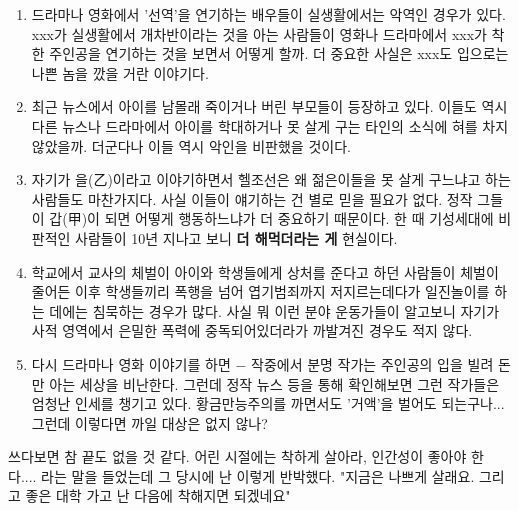 \vspace{5mm}
\begin{enumerate}
    \item 드라마나 영화에서 '선역'을 연기하는 배우들이 실생활에서는 악역인 경우가 있다.
    xxx가 실생활에서 개차반이라는 것을 아는 사람들이 영화나 드라마에서 xxx가 착한 주인공을 연기하는 것을 보면서 어떻게 할까.
    더 중요한 사실은 xxx도 입으로는 나쁜 놈을 깠을 거란 이야기다.
    \vspace{5mm}
    
    \item 최근 뉴스에서 아이를 남몰래 죽이거나 버린 부모들이 등장하고 있다.
    이들도 역시 다른 뉴스나 드라마에서 아이를 학대하거나 못 살게 구는 타인의 소식에 혀를 차지 않았을까.
    더군다나 이들 역시 악인을 비판했을 것이다.
    \vspace{5mm}
    
    \item 자기가 을(乙)이라고 이야기하면서 헬조선은 왜 젊은이들을 못 살게 구느냐고 하는 사람들도 마찬가지다.
    사실 이들이 얘기하는 건 별로 믿을 필요가 없다. 정작 그들이 갑(甲)이 되면 어떻게 행동하느냐가 더 중요하기 때문이다.
    한 때 기성세대에 비판적인 사람들이 10년 지나고 보니 \textbf{더 해먹더라는 게} 현실이다.
    \vspace{5mm}
    
    \item 학교에서 교사의 체벌이 아이와 학생들에게 상처를 준다고 하던 사람들이 체벌이 줄어든 이후
    학생들끼리 폭행을 넘어 엽기범죄까지 저지르는데다가 일진놀이를 하는 데에는 침묵하는 경우가 많다.
    사실 뭐 이런 분야 운동가들이 알고보니 자기가 사적 영역에서 은밀한 폭력에 중독되어있더라가 까발겨진 경우도 적지 않다.
    \vspace{5mm}
    
    \item 다시 드라마나 영화 이야기를 하면 $-$ 작중에서 분명 작가는 주인공의 입을 빌려 돈만 아는 세상을 비난한다.
    그런데 정작 뉴스 등을 통해 확인해보면 그런 작가들은 엄청난 인세를 챙기고 있다.
    황금만능주의를 까면서도 '거액'을 벌어도 되는구나... 그런데 이렇다면 까일 대상은 없지 않나?
    \vspace{5mm}
\end{enumerate}

쓰다보면 참 끝도 없을 것 같다.
어린 시절에는 착하게 살아라, 인간성이 좋아야 한다.... 라는 말을 들었는데
그 당시에 난 이렇게 반박했다. "지금은 나쁘게 살래요. 그리고 좋은 대학 가고 난 다음에 착해지면 되겠네요"
\vspace{5mm}

